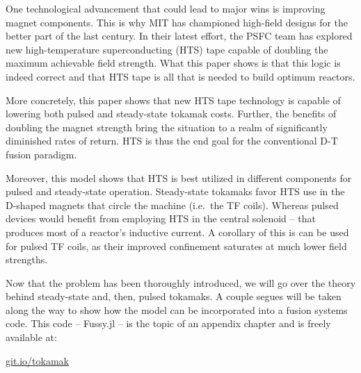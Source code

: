 One technological advancement that could lead to major wins is improving magnet components. This is why MIT has championed high-field designs for the better part of the last century. In their latest effort, the PSFC team has explored new high-temperature superconducting (HTS) tape capable of doubling the maximum achievable field strength. What this paper shows is that this logic is indeed correct and that HTS tape is all that is needed to build optimum reactors.

More concretely, this paper shows that new HTS tape technology is capable of lowering both pulsed and steady-state tokamak costs. Further, the benefits of doubling the magnet strength bring the situation to a realm of significantly diminished rates of return. HTS is thus the end goal for the conventional D-T fusion paradigm. 

Moreover, this model shows that HTS is best utilized in different components for pulsed and steady-state operation. Steady-state tokamaks favor HTS use in the D-shaped magnets that circle the machine (i.e.\ the TF coils). Whereas pulsed devices would benefit from employing HTS in the central solenoid -- that produces most of a reactor's inductive current. A corollary of this is  can be used for pulsed TF coils, as their improved confinement saturates at much lower field strengths.

Now that the problem has been thoroughly introduced, we will go over the theory behind steady-state and, then, pulsed tokamaks. A couple segues will be taken along the way to show how the model can be incorporated into a fusion systems code. This code -- Fussy.jl -- is the topic of an appendix chapter and is freely available at:
 
{\centering \href{http://git.io/tokamak}{git.io/tokamak} \par }

\clearpage

\newpage

